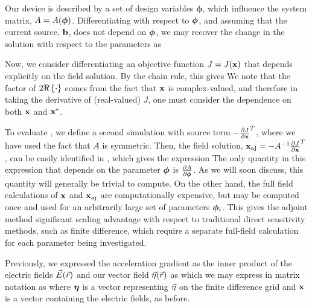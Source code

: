 Our device is described by a set of design variables $\bm{\phi}$, which influence the system matrix, $A = A(\bm{\phi})$.
Differentiating  with respect to $\bm{\phi}$, and assuming that the current source, $\mathbf{b}$, does not depend on $\bm{\phi}$, we may recover the change in the solution with respect to the parameters as
%

Now, we consider differentiating an objective function $J = J(\mathbf{x})$ that depends explicitly on the field solution.
By the chain rule, this gives
%
We note that the factor of $2 \Re \left\{ \cdot \right\} $ comes from the fact that $\mathbf{x}$ is complex-valued, and therefore in taking the derivative of (real-valued) $J$, one must consider the dependence on both $\mathbf{x}$ and $\mathbf{x}^*$.

To evaluate , we define a second simulation with source term $-\frac{\partial J}{\partial \mathbf{x}}^T$,
%
where we have used the fact that $A$ is symmetric.
Then, the field solution, $\mathbf{x}_{\textrm{aj}} = -A^{-1}\frac{\partial J}{\partial \mathbf{x}}^T$, can be easily identified in , which gives the expression
%
%
The only quantity in this expression that depends on the parameter $\bm{\phi}$ is $\frac{\partial A}{\partial \bm{\phi}}$.
As we will soon discuss, this quantity will generally be trivial to compute.
On the other hand, the full field calculations of $\mathbf{x}$ and $\mathbf{x}_{\textrm{aj}}$ are computationally expensive, but may be computed once and used for an arbitrarily large set of parameters $\bm{\phi}_i$.
This gives the adjoint method significant scaling advantage with respect to traditional direct sensitivity methods, such as finite difference, which require a separate full-field calculation for each parameter being investigated.

Previously, we expressed the acceleration gradient as the inner product of the electric fields $\vec{E}(\vec{r})$ and our vector field $\vec{\eta}(\vec{r})$ as
%
%
which we may express in matrix notation as
%
%
where $\bm{\eta}$ is a vector representing $\vec{\eta}$ on the finite difference grid and $\mathbf{x}$ is a vector containing the electric fields, as before.

